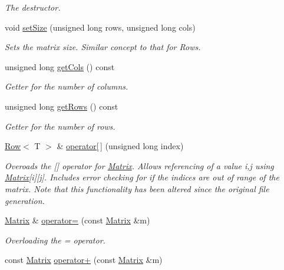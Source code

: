 \begin{DoxyCompactItemize}
\begin{DoxyCompactList}\small\item\em The destructor. \end{DoxyCompactList}\item 
void \hyperlink{class_matrix_aa393296d4132d7aafc4e236ddfe59f06}{set\+Size} (unsigned long rows, unsigned long cols)
\begin{DoxyCompactList}\small\item\em Sets the matrix size. Similar concept to that for Rows. \end{DoxyCompactList}\item 
unsigned long \hyperlink{class_matrix_a9b4ce445c65dcea66c66dda875cc39d8}{get\+Cols} () const 
\begin{DoxyCompactList}\small\item\em Getter for the number of columns. \end{DoxyCompactList}\item 
unsigned long \hyperlink{class_matrix_a442879db6473eeab202928dc47992206}{get\+Rows} () const 
\begin{DoxyCompactList}\small\item\em Getter for the number of rows. \end{DoxyCompactList}\item 
\hyperlink{class_row}{Row}$<$ T $>$ \& \hyperlink{class_matrix_ae7e14b4bd8bb570260a4e578e4a601b7}{operator\mbox{[}$\,$\mbox{]}} (unsigned long index)
\begin{DoxyCompactList}\small\item\em Overoads the \mbox{[}\mbox{]} operator for \hyperlink{class_matrix}{Matrix}. Allows referencing of a value i,j using \hyperlink{class_matrix}{Matrix}\mbox{[}i\mbox{]}\mbox{[}j\mbox{]}. Includes error checking for if the indices are out of range of the matrix. Note that this functionality has been altered since the original file generation. \end{DoxyCompactList}\item 
\hyperlink{class_matrix}{Matrix} \& \hyperlink{class_matrix_a94508f84ba0d62e81aa8d508aa43f1ec}{operator=} (const \hyperlink{class_matrix}{Matrix} \&m)
\begin{DoxyCompactList}\small\item\em Overloading the = operator. \end{DoxyCompactList}\item 
const \hyperlink{class_matrix}{Matrix} \hyperlink{class_matrix_a311f3649e41cb4a3155f3f71a65829cb}{operator+} (const \hyperlink{class_matrix}{Matrix} \&m)

\end{DoxyCompactItemize}
